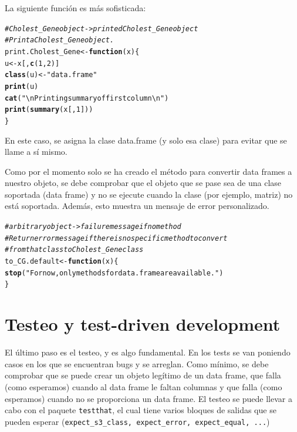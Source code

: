 \documentclass{config/apuntes}\usepackage[]{graphicx}\usepackage[]{xcolor}
\makeatletter
\newcommand{\hlnum}[1]{\textcolor[rgb]{0.686,0.059,0.569}{#1}}%
\newcommand{\hlsng}[1]{\textcolor[rgb]{0.192,0.494,0.8}{#1}}%
\newcommand{\hlcom}[1]{\textcolor[rgb]{0.678,0.584,0.686}{\textit{#1}}}%
\newcommand{\hldef}[1]{\textcolor[rgb]{0.345,0.345,0.345}{#1}}%
\newcommand{\hlkwa}[1]{\textcolor[rgb]{0.161,0.373,0.58}{\textbf{#1}}}%
\newcommand{\hlkwb}[1]{\textcolor[rgb]{0.69,0.353,0.396}{#1}}%
\newcommand{\hlkwc}[1]{\textcolor[rgb]{0.333,0.667,0.333}{#1}}%
\newcommand{\hlkwd}[1]{\textcolor[rgb]{0.737,0.353,0.396}{\textbf{#1}}}%
\newenvironment{kframe}{%
 \def\at@end@of@kframe{}%
 \ifinner\ifhmode%
  \def\at@end@of@kframe{\end{minipage}}%
  \begin{minipage}{\columnwidth}%
 \fi\fi%
 \def\FrameCommand##1{\hskip\@totalleftmargin \hskip-\fboxsep
 \colorbox{shadecolor}{##1}\hskip-\fboxsep
     \hskip-\linewidth \hskip-\@totalleftmargin \hskip\columnwidth}%
 \MakeFramed {\advance\hsize-\width
   \@totalleftmargin\z@ \linewidth\hsize
   \@setminipage}}%
 {\par\unskip\endMakeFramed%
 \at@end@of@kframe}
\newenvironment{knitrout}{}{} %
\newcommand{\code}[1]{\texttt{#1}}
\makeatother
\begin{document}
La siguiente función es más sofisticada:
\begin{knitrout}
\color{fgcolor}\begin{kframe}
\begin{alltt}
\hlcom{# Cholest_Gene object -> printed Cholest_Gene object}
\hlcom{# Print a Cholest_Gene object.}
\hldef{print.Cholest_Gene} \hlkwb{<-} \hlkwa{function}\hldef{(}\hlkwc{x}\hldef{) \{}
    \hldef{u} \hlkwb{<-} \hldef{x[,} \hlkwd{c}\hldef{(}\hlnum{1}\hldef{,} \hlnum{2}\hldef{)]}
    \hlkwd{class}\hldef{(u)} \hlkwb{<-} \hlsng{"data.frame"}
    \hlkwd{print}\hldef{(u)}
    \hlkwd{cat}\hldef{(}\hlsng{"\textbackslash{}n Printing summary of first column \textbackslash{}n"}\hldef{)}
    \hlkwd{print}\hldef{(}\hlkwd{summary}\hldef{(x[,} \hlnum{1}\hldef{]))}
\hldef{\}}
\end{alltt}
\end{kframe}
\end{knitrout}

En este caso, se asigna la clase data.frame (y solo esa clase) para evitar que se llame a sí mismo.

Como por el momento solo se ha creado el método para convertir data frames a nuestro objeto, se debe comprobar que el objeto que se pase sea de una clase soportada (data frame) y no se ejecute cuando la clase (por ejemplo, matriz) no está soportada. Además, esto muestra un mensaje de error personalizado.
\begin{knitrout}
\color{fgcolor}\begin{kframe}
\begin{alltt}
\hlcom{# arbitrary object -> failure message if no method}
\hlcom{# Return error message if there is no specific method to convert }
\hlcom{# from that class to Cholest_Gene class}
\hldef{to_CG.default} \hlkwb{<-} \hlkwa{function}\hldef{(}\hlkwc{x}\hldef{) \{}
    \hlkwd{stop}\hldef{(}\hlsng{"For now, only methods for data.frame are available."}\hldef{)}
\hldef{\}}
\end{alltt}
\end{kframe}
\end{knitrout}

\section{Testeo y test-driven development}
El último paso es el testeo, y es algo fundamental. En los tests se van poniendo casos en los que se encuentran bugs y se arreglan. Como mínimo, se debe comprobar que se puede crear un objeto legítimo de un data frame, que falla (como esperamos) cuando al data frame le faltan columnas y que falla (como esperamos) cuando no se proporciona un data frame. El testeo se puede llevar a cabo con el paquete \code{testthat}, el cual tiene varios bloques de salidas que se pueden esperar (\code{expect\_s3\_class, expect\_error, expect\_equal, ...})
\end{document}
